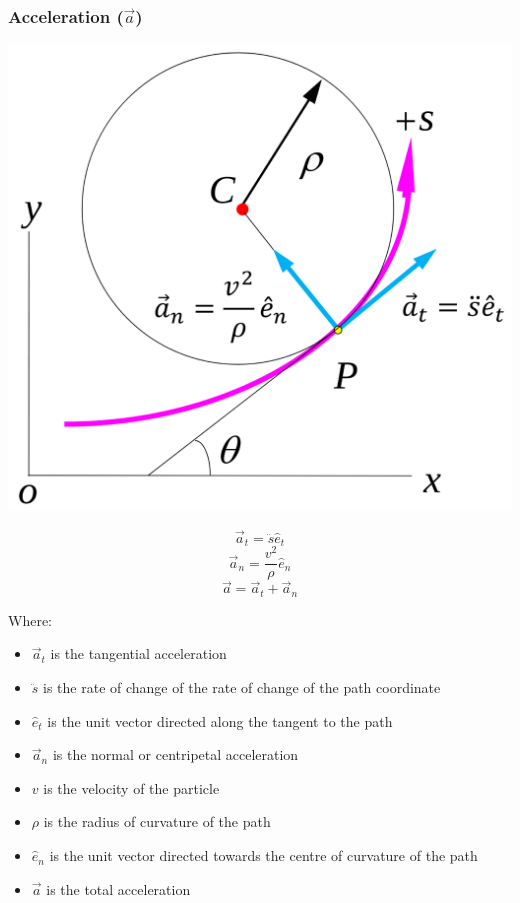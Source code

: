 \documentclass[11pt]{article}
\begin{document}
\subsubsection{Acceleration (\(\vec{a}\))}
\label{sec:orgc86e727}
\begin{center}
\includegraphics[scale=0.4]{./images/acceleration-in-path-coordinate-system.png}
\end{center}

\[\vec{a}_t = \ddot{s} \hat{e}_t\]
\[\vec{a}_n = \frac{v^2}{\rho} \hat{e}_n\]
\[\vec{a} = \vec{a}_t + \vec{a}_n\]

Where:
\begin{itemize}
\item \(\vec{a}_t\) is the tangential acceleration
\item \(\ddot{s}\) is the rate of change of the rate of change of the path coordinate
\item \(\hat{e}_t\) is the unit vector directed along the tangent to the path
\item \(\vec{a}_n\) is the normal or centripetal acceleration
\item \(v\) is the velocity of the particle
\item \(\rho\) is the radius of curvature of the path
\item \(\hat{e}_n\) is the unit vector directed towards the centre of curvature of the path
\item \(\vec{a}\) is the total acceleration
\end{itemize}
\end{document}
